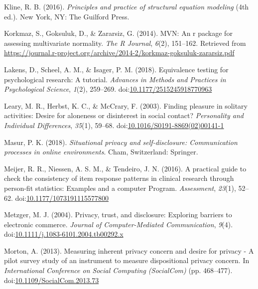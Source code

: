 \documentclass[man,floatsintext]{apa6}
\begin{document}
\leavevmode\hypertarget{ref-Kline.2016}{}%
Kline, R. B. (2016). \emph{Principles and practice of structural equation modeling} (4th ed.). New York, NY: The Guilford Press.

\leavevmode\hypertarget{ref-R-MVN}{}%
Korkmaz, S., Goksuluk, D., \& Zararsiz, G. (2014). MVN: An r package for assessing multivariate normality. \emph{The R Journal}, \emph{6}(2), 151--162. Retrieved from \url{https://journal.r-project.org/archive/2014-2/korkmaz-goksuluk-zararsiz.pdf}

\leavevmode\hypertarget{ref-Lakens.2018}{}%
Lakens, D., Scheel, A. M., \& Isager, P. M. (2018). Equivalence testing for psychological research: A tutorial. \emph{Advances in Methods and Practices in Psychological Science}, \emph{1}(2), 259--269. doi:\href{https://doi.org/10.1177/2515245918770963}{10.1177/2515245918770963}

\leavevmode\hypertarget{ref-Leary.2003}{}%
Leary, M. R., Herbst, K. C., \& McCrary, F. (2003). Finding pleasure in solitary activities: Desire for aloneness or disinterest in social contact? \emph{Personality and Individual Differences}, \emph{35}(1), 59--68. doi:\href{https://doi.org/10.1016/S0191-8869(02)00141-1}{10.1016/S0191-8869(02)00141-1}

\leavevmode\hypertarget{ref-Masur.2018}{}%
Masur, P. K. (2018). \emph{Situational privacy and self-disclosure: Communication processes in online environments}. Cham, Switzerland: Springer.

\leavevmode\hypertarget{ref-Meijer.2016}{}%
Meijer, R. R., Niessen, A. S. M., \& Tendeiro, J. N. (2016). A practical guide to check the consistency of item response patterns in clinical research through person-fit statistics: Examples and a computer Program. \emph{Assessment}, \emph{23}(1), 52--62. doi:\href{https://doi.org/10.1177/1073191115577800}{10.1177/1073191115577800}

\leavevmode\hypertarget{ref-Metzger.2004}{}%
Metzger, M. J. (2004). Privacy, trust, and disclosure: Exploring barriers to electronic commerce. \emph{Journal of Computer-Mediated Communication}, \emph{9}(4). doi:\href{https://doi.org/10.1111/j.1083-6101.2004.tb00292.x}{10.1111/j.1083-6101.2004.tb00292.x}

\leavevmode\hypertarget{ref-Morton.2013}{}%
Morton, A. (2013). Measuring inherent privacy concern and desire for privacy - A pilot survey study of an instrument to measure dispositional privacy concern. In \emph{International Conference on Social Computing (SocialCom)} (pp. 468--477). doi:\href{https://doi.org/10.1109/SocialCom.2013.73}{10.1109/SocialCom.2013.73}
\end{document}
